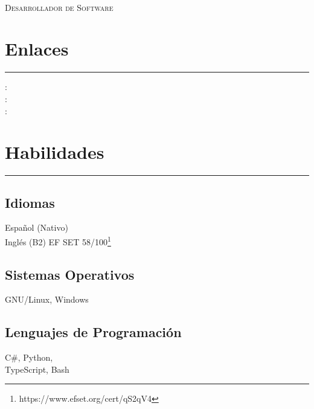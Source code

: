 \documentclass[]{rahulworld-resume}
\begin{document}
%
%
\begin{large}
    \\
\end{large}

\begin{minipage}[t]{0.33\textwidth}
    \textsc{Desarrollador de Software}\\

    \section{Enlaces}
    \noindent\rule{5cm}{0.4pt}

    : \href{https://github.com/jamerrq}{} \\
    : \href{https://www.linkedin.com/in/jamerrq}{} \\
    : \href{https://jamerrq.deno.dev/}{}
    \section{Habilidades}
    \noindent\rule{5cm}{0.4pt}
    \subsection{Idiomas}
    Español (Nativo)\\
    Inglés (B2) EF SET 58/100\footnote{https://www.efset.org/cert/qS2qV4}\\
    \vspace{1pt}
    \subsection{Sistemas Operativos}
    GNU/Linux, Windows\\
    \vspace{1pt}
    \subsection{Lenguajes de Programación}
    C\#, Python,\\
    TypeScript, Bash\\
    \vspace{1pt}

\end{minipage}
\end{document}
